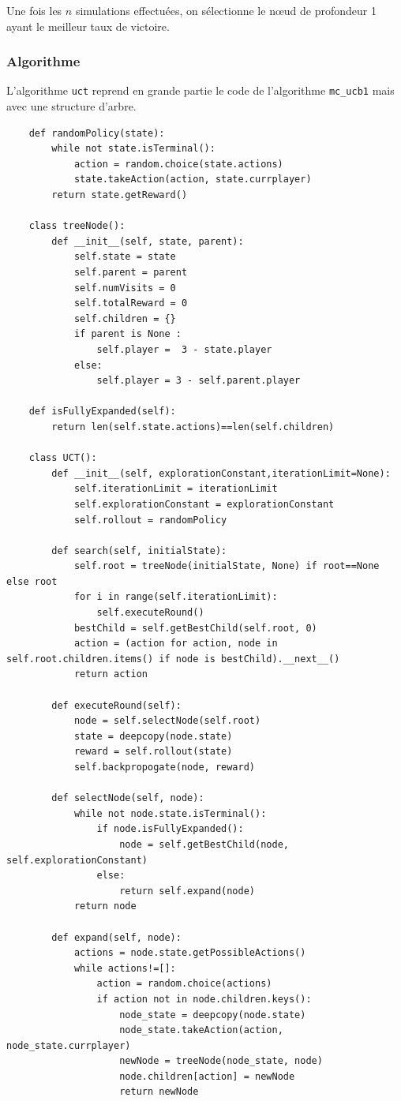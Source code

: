 \documentclass[a4paper]{article}
\theoremstyle{definition}
\begin{document}
Une fois les $n$ simulations effectuées, on sélectionne le nœud de profondeur 1 ayant le meilleur taux de victoire.

\subsubsection{Algorithme}

L'algorithme \texttt{uct} reprend en grande partie le code de l'algorithme \texttt{mc\_ucb1} mais avec une structure d'arbre.

\begin{lstlisting}
	def randomPolicy(state):
		while not state.isTerminal():
			action = random.choice(state.actions)
			state.takeAction(action, state.currplayer)
		return state.getReward()
	
	class treeNode():
		def __init__(self, state, parent):
			self.state = state
			self.parent = parent
			self.numVisits = 0
			self.totalReward = 0
			self.children = {}
			if parent is None : 
				self.player =  3 - state.player
			else:
				self.player = 3 - self.parent.player
	
	def isFullyExpanded(self):
		return len(self.state.actions)==len(self.children)
	
	class UCT():
		def __init__(self, explorationConstant,iterationLimit=None):
			self.iterationLimit = iterationLimit
			self.explorationConstant = explorationConstant
			self.rollout = randomPolicy
		
		def search(self, initialState):
			self.root = treeNode(initialState, None) if root==None else root
			for i in range(self.iterationLimit):
				self.executeRound()
			bestChild = self.getBestChild(self.root, 0)
			action = (action for action, node in self.root.children.items() if node is bestChild).__next__()
			return action
		
		def executeRound(self):
			node = self.selectNode(self.root)
			state = deepcopy(node.state)
			reward = self.rollout(state)
			self.backpropogate(node, reward)
		
		def selectNode(self, node):
			while not node.state.isTerminal():
				if node.isFullyExpanded():
					node = self.getBestChild(node, self.explorationConstant)
				else:
					return self.expand(node)
			return node
		
		def expand(self, node):
			actions = node.state.getPossibleActions()
			while actions!=[]:
				action = random.choice(actions)
				if action not in node.children.keys():
					node_state = deepcopy(node.state)
					node_state.takeAction(action, node_state.currplayer)
					newNode = treeNode(node_state, node)
					node.children[action] = newNode
					return newNode
			

\end{lstlisting}
\end{document}
